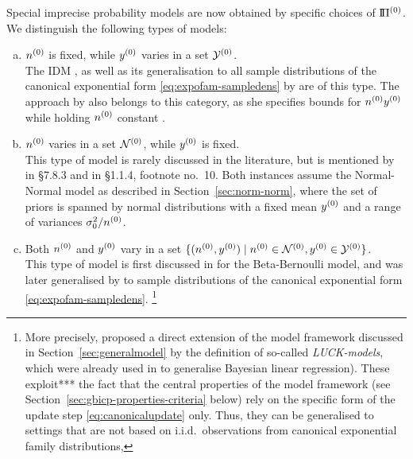 Special imprecise probability models are now obtained by specific choices of $\text{I}\!\Pi^{(0)}$.
We distinguish the following types of models:
\begin{enumerate}[(a)]
\item $n^{(0)}$ is fixed, while $y^{(0)}$ varies in a set $\mathcal{Y}^{(0)}$.\\
\label{enum:modeltypes-a}%
The IDM \parencite{1996:walley::idm},
as well as its generalisation to all sample distributions of the canonical exponential form \eqref{eq:expofam-sampledens}
by \textcite{2005:quaeghebeurcooman} are of this type.
The approach by \textcite{1997:boratynska} also belongs to this category,
as she specifies bounds for $n^{(0)} y^{(0)}$ while holding $n^{(0)}$ constant \parencite[see][p.~1973]{2012:benavolizaffalon}.
\item $n^{(0)}$ varies in a set $\mathcal{N}^{(0)}$, while $y^{(0)}$ is fixed.\\
\label{enum:varyn}%
This type of model is rarely discussed in the literature,
but is mentioned by \textcite{1991:walley} in {\S 7.8.3} and in {\S 1.1.4}, footnote no.~10.
Both instances assume the Normal-Normal model as described in Section~\ref{sec:norm-norm},
where the set of priors is spanned by normal distributions with a fixed mean $y^{(0)}$ and a range of variances $\sigma_0^2 / n^{(0)}$.
\item Both $n^{(0)}$ and $y^{(0)}$ vary in a set $\{ (n^{(0)}, y^{(0)}) \mid n^{(0)} \in \mathcal{N}^{(0)}, y^{(0)} \in \mathcal{Y}^{(0)} \}$.\\
\label{enum:rectangular}%
This type of model is first discussed in \textcite[\S 5.4.3]{1991:walley} for the Beta-Bernoulli model,
and was later generalised by \textcite{Walter2009a}
to sample distributions of the canonical exponential form \eqref{eq:expofam-sampledens}.%
\footnote{%
More precisely, \textcite[see Section~\ref{sec:jstp}]{Walter2009a} proposed
a direct extension of the model framework discussed in Section~\ref{sec:generalmodel}
by the definition of so-called \emph{LUCK-models},
which were already used in \textcite{Walter2007a}
to generalise Bayesian linear regression). %
These exploit*** the fact that the central properties of the model framework
(see Section~\ref{sec:gbicp-properties-criteria} below)
rely on the specific form of the update step \eqref{eq:canonicalupdate} only.
Thus, they can be generalised to settings that are not based on i.i.d.\ observations from canonical exponential family distributions,
}
\end{enumerate}
